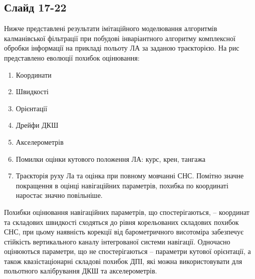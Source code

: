 \documentclass[ukrainian,utf8,simple,floatsubsection, hpadding=1mm,equationsubsection,]{eskdtext}
\begin{document}
\subsection*{Слайд 17-22}
Нижче представлені результати імітаційного моделювання алгоритмів калманівської фільтрації при побудові інваріантного алгоритму комплексної обробки інформації на прикладі польоту ЛА за заданою траєкторією. На рис  представлено еволюції похибок оцінювання:

\begin{enumerate}
 \item Координати
 \item Швидкості
 \item Орієнтації
 \item Дрейфи ДКШ
 \item Акселерометрів
 \item Помилки оцінки кутового положення ЛА: курс, крен, тангажа
 \item Траєкторія руху Ла та оцінка при повному мовчанні СНС. Помітно значне покращення в оцінці навігаційних параметрів, похибка по координаті наростає значно повільніше.
\end{enumerate}

Похибки оцінювання навігаційних параметрів, що спостерігаються, -- координат та складових швидкості сходяться до рівня корельованих складових похибок СНС, при цьому наявність корекції від барометричного висотоміра забезпечує стійкість вертикального каналу інтегрованої системи навігації. Одночасно оцінюються параметри, що не спостерігаються -- параметри кутової орієнтації, а також квазістаціонарні складові похибок ДПІ, які можна використовувати для польотного калібрування ДКШ та акселерометрів. 
\end{document}
